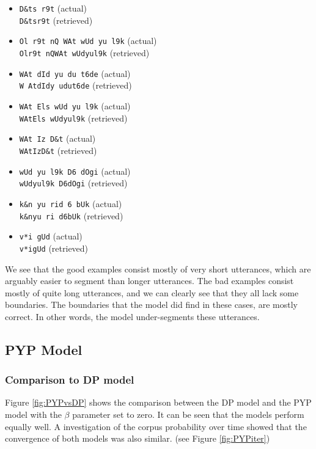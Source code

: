 \begin{multicols}{2}
\begin{itemize}
\item \texttt{D\&ts r9t} (actual)\\ \texttt{D\&tsr9t} (retrieved)
\item \texttt{Ol r9t nQ WAt wUd yu l9k} (actual)\\ \texttt{Olr9t nQWAt wUdyul9k} (retrieved)
\item \texttt{WAt dId yu du t6de} (actual)\\ \texttt{W AtdIdy udut6de} (retrieved)
\item \texttt{WAt Els wUd yu l9k} (actual)\\ \texttt{WAtEls wUdyul9k} (retrieved)
\item \texttt{WAt Iz D\&t} (actual)\\ \texttt{WAtIzD\&t} (retrieved)
\item \texttt{wUd yu l9k D6 dOgi} (actual)\\ \texttt{wUdyul9k D6dOgi} (retrieved)
\item \texttt{k\&n yu rid 6 bUk} (actual)\\ \texttt{k\&nyu ri d6bUk} (retrieved)
\item \texttt{v*i gUd} (actual)\\ \texttt{v*igUd} (retrieved)
\end{itemize}

\end{multicols}

We see that the good examples consist mostly of very short utterances, which are arguably easier to segment than longer utterances. The bad examples consist mostly of quite long utterances, and we can clearly see that they all lack some boundaries. The boundaries that the model did find in these cases, are mostly correct. In other words, the model under-segments these utterances.

\subsection{PYP Model}

\subsubsection{Comparison to DP model}
Figure \ref{fig:PYPvsDP} shows the comparison between the DP model and the PYP model with the $\beta$ parameter set to zero. It can be seen that the models perform equally well. A investigation of the corpus probability over time showed that the convergence of both models was also similar. (see Figure \ref{fig:PYPiter})


